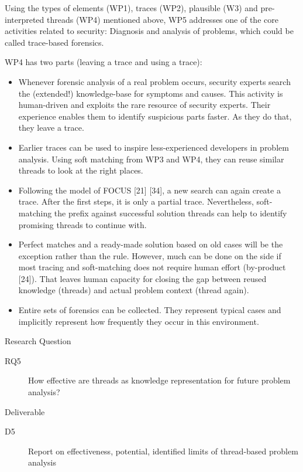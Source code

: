 Using the types of elements (WP1), traces (WP2), plausible (W3) and pre-interpreted threads (WP4) mentioned above, WP5 addresses one of the core activities related to security: Diagnosis and analysis of problems, which could be called trace-based forensics.

WP4 has two parts (leaving a trace and using a trace):
\begin{itemize}
\item Whenever forensic analysis of a real problem occurs, security experts search the (extended!) knowledge-base for symptoms and causes. This activity is human-driven and exploits the rare resource of security experts. Their experience enables them to identify suspicious parts faster. As they do that, they leave a trace. 
\item Earlier traces can be used to inspire less-experienced developers in problem analysis. Using soft matching from WP3 and WP4, they can reuse similar threads to look at the right places.
\item Following the model of FOCUS [21] [34], a new search can again create a trace. After the first steps, it is only a partial trace. Nevertheless, soft-matching the prefix against successful solution threads can help to identify promising threads to continue with. 
\item Perfect matches and a ready-made solution based on old cases will be the exception rather than the rule. However, much can be done on the side if most tracing and soft-matching does not require human effort (by-product [24]). That leaves human capacity for closing the gap between reused knowledge (threads) and actual problem context (thread again).
\item Entire sets of forensics can be collected. They represent typical cases and implicitly represent how frequently they occur in this environment. 
\end{itemize}

Research Question
\begin{description}
	\item[RQ5]	How effective are threads as knowledge representation for future problem analysis?
\end{description}
	
Deliverable
\begin{description}
	\item[D5] Report on effectiveness, potential, identified limits of thread-based problem analysis
\end{description}

